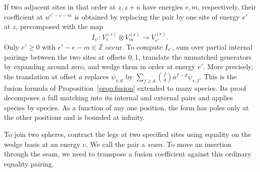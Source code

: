 If two adjacent sites in that order at \(z,z+u\) have energies \(e,m\), respectively, their
coefficient at \(u^{e'-e-m}\) is obtained by replacing the pair by one
site of energy \(e'\) at \(z\), precomposed with the map
\[
 I_{e'}:V^{(r)}_e\otimes V^{(r)}_m\longrightarrow V^{(r)}_{e'}.
\]
Only \(e'\ge0\) with \(e'-e-m\in\mathbb Z\) occur. To compute
\(I_{e'}\), sum over partial internal pairings between the two sites at
offsets \(0,1\), translate the unmatched generators by expanding around
zero, and wedge them in order at energy \(e'\). More precisely, the
translation at offset \(a\) replaces \(\psi_{s,d}\) by
\(\sum_{f\ge d}\binom fd a^{f-d}\psi_{s,f}\). This is the fusion
formula of Proposition~\ref{prop:fusion} extended to many species. Its proof decomposes a full
matching into its internal and external pairs and applies species by
species. As a function of any one position, the form has poles only at
the other positions and is bounded at infinity.

To join two spheres, contract the legs at two specified sites using
equality on the wedge basis at an energy \(e\). We call the pair a
\emph{seam}. To move an insertion through the seam, we need to transpose
a fusion coefficient against this ordinary equality pairing.

